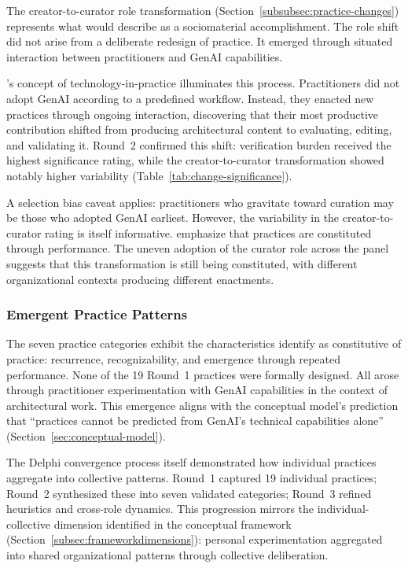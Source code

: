 The creator-to-curator role transformation
(Section~\ref{subsubsec:practice-changes}) represents what
\textcite{orlikowski_sociomaterial_2007} would describe as a sociomaterial
accomplishment. The role shift did not arise from a deliberate redesign of
practice. It emerged through situated interaction between practitioners and
GenAI capabilities.

\textcite{orlikowski_using_2000}'s concept of technology-in-practice
illuminates this process. Practitioners did not adopt GenAI according to a
predefined workflow. Instead, they enacted new practices through ongoing
interaction, discovering that their most productive contribution shifted from
producing architectural content to evaluating, editing, and validating it.
Round~2 confirmed this shift: verification burden received the highest
significance rating, while the creator-to-curator transformation showed
notably higher variability (Table~\ref{tab:change-significance}).

A selection bias caveat applies: practitioners who gravitate toward curation
may be those who adopted GenAI earliest. However, the variability in the
creator-to-curator rating is itself informative.
\textcite{feldman_theorizing_2011} emphasize that practices are constituted
through performance. The uneven adoption of the curator role across the panel
suggests that this transformation is still being constituted, with different
organizational contexts producing different enactments.

\subsubsection{Emergent Practice Patterns}

The seven practice categories exhibit the characteristics
\textcite{feldman_theorizing_2011} identify as constitutive of practice:
recurrence, recognizability, and emergence through repeated performance. None
of the 19 Round~1 practices were formally designed. All arose through
practitioner experimentation with GenAI capabilities in the context of
architectural work. This emergence aligns with the conceptual model's
prediction that ``practices cannot be predicted from GenAI's technical
capabilities alone'' (Section~\ref{sec:conceptual-model}).

The Delphi convergence process itself demonstrated how individual practices
aggregate into collective patterns. Round~1 captured 19 individual practices;
Round~2 synthesized these into seven validated categories; Round~3 refined
heuristics and cross-role dynamics. This progression mirrors the
individual-collective dimension identified in the conceptual framework
(Section~\ref{subsec:frameworkdimensions}): personal experimentation aggregated
into shared organizational patterns through collective deliberation.


